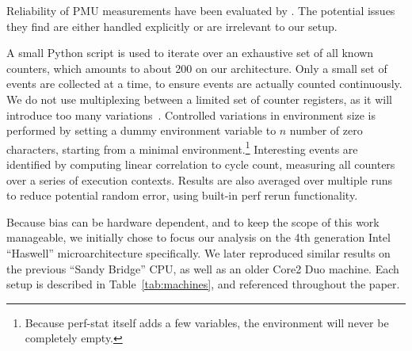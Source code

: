 \documentclass[prodmode,acmtaco]{acmsmall}
\begin{document}
Reliability of PMU measurements have been evaluated by .
The potential issues they find are either handled explicitly or are irrelevant to our setup.

A small Python script is used to iterate over an exhaustive set of all known counters, which amounts to about 200 on our architecture.
Only a small set of events are collected at a time, to ensure events are actually counted continuously.
We do not use multiplexing between a limited set of counter registers, as it will introduce too many variations~\cite{Wiplove:ImproveEstimation}. %
Controlled variations in environment size is performed by setting a dummy environment variable to $n$ number of zero characters, starting from a minimal environment.\footnote{Because perf-stat itself adds a few variables, the environment will never be completely empty.}
Interesting events are identified by computing linear correlation to cycle count, measuring all counters over a series of execution contexts.
Results are also averaged over multiple runs to reduce potential random error, using built-in perf rerun functionality.

Because bias can be hardware dependent, and to keep the scope of this work manageable, we initially chose to focus our analysis on the 4th generation Intel ``Haswell'' microarchitecture specifically.
We later reproduced similar results on the previous ``Sandy Bridge'' CPU, as well as an older Core2 Duo machine.
Each setup is described in Table~\ref{tab:machines}, and referenced throughout the paper.

\begin{table}
\end{table}
\end{document}
